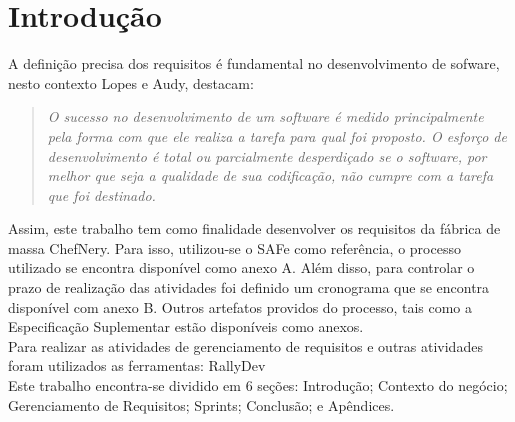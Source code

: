 
\chapter[Introdução]{Introdução}

A definição precisa dos requisitos é fundamental  no desenvolvimento de sofware, nesto contexto Lopes e  Audy, destacam:

\begin{quotation}
\textit{O sucesso no desenvolvimento de um software é medido principalmente pela forma com que ele realiza a tarefa para qual foi proposto. O esforço de desenvolvimento é total ou parcialmente desperdiçado se o software, por melhor que seja a qualidade de sua codificação, não cumpre com a tarefa que foi destinado.}
\end{quotation}

Assim, este trabalho tem como finalidade desenvolver os requisitos da fábrica de massa ChefNery. Para isso, utilizou-se o SAFe como referência, o processo utilizado se encontra disponível como anexo A.  Além disso, para controlar o prazo de realização das atividades foi definido um cronograma que se encontra disponível com anexo B. Outros artefatos providos do processo, tais como a Especificação Suplementar estão disponíveis como anexos. \\
\tab Para realizar as atividades de gerenciamento de requisitos e outras atividades foram utilizados as ferramentas: RallyDev \\
\tab  Este trabalho encontra-se dividido em 6 seções: Introdução; Contexto do negócio; Gerenciamento de Requisitos; Sprints; Conclusão; e Apêndices.\\